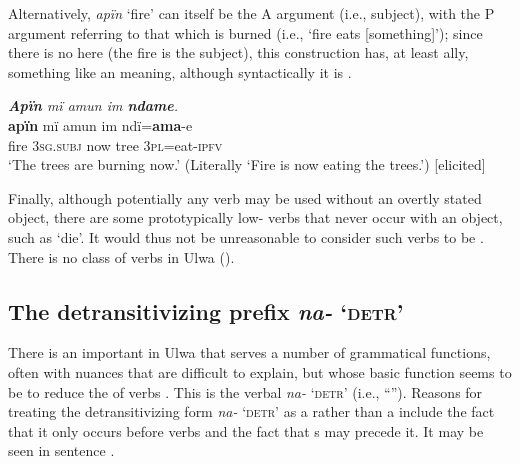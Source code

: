   Alternatively, \textit{apïn} ‘fire’ can itself be the A argument (i.e., subject), with the P argument referring to that which is burned (i.e., ‘fire eats [something]’); since there is no   here (the fire is the subject), this construction has, at least ally, something like an  meaning, although syntactically it is  .

  \ea%
    \label{ex:syntax:297b}
          \textit{\textbf{Apïn} mï amun im \textbf{ndame}.}\\
\gll   \textbf{apïn} mï amun im ndï=\textbf{ama}-e\\
    fire 3\textsc{sg.subj} now tree 3\textsc{pl}=eat-\textsc{ipfv}\\
\glt `The trees are burning now.’ (Literally ‘Fire is now eating the trees.’) [elicited]
\z
  
  Finally, although potentially any verb may be used without an overtly stated object, there are some prototypically low- verbs that never occur with an object, such as ‘die’. It would thus not be unreasonable to consider such verbs to be . There is no class of  verbs in Ulwa ().


\subsection{The detransitivizing prefix \textit{na-} ‘\textsc{detr}’}\label{sec:13.8.2}


There is an important  in Ulwa that serves a number of grammatical functions, often with nuances that are difficult to explain, but whose basic function seems to be to reduce the  of verbs \citep{Barlow2019b}. This is the verbal  \textit{na-} ‘\textsc{detr’} (i.e., “”). Reasons for treating the detransitivizing form \textit{na-} \textsc{‘detr’} as a  rather than a  include the fact that it only occurs before verbs and the fact that  s may precede it. It may be seen in sentence .

